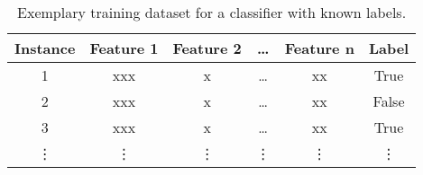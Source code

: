 \begin{table}[ht]
    \small
    \centering
    \begin{tabular}{@{}cccccc@{}}
        \toprule
        \textbf{Instance} & \textbf{Feature 1} & \textbf{Feature 2} & \dots  & \textbf{Feature n} & \textbf{Label} \\
        \midrule
        1                 & xxx                & x                  & \dots  & xx                 & True           \\
        2                 & xxx                & x                  & \dots  & xx                 & False          \\
        3                 & xxx                & x                  & \dots  & xx                 & True           \\
        \vdots            & \vdots             & \vdots             & \vdots & \vdots             & \vdots         \\
        \bottomrule
    \end{tabular}
    \caption[Exemplary training dataset for a classifier with known labels.]{Exemplary training dataset for a classifier with known labels. \footnotemark}
    \label{tab:classifier_label_data}
\end{table}
